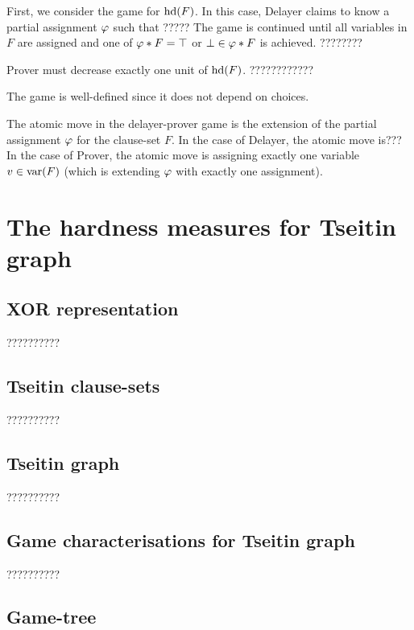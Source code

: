 \documentclass[]{book}
\begin{document}
First, we consider the game for $\operatorname{hd}(F)$. In this case, Delayer claims to know a partial assignment $\varphi$ such that ?????
The game is continued until all variables in $F$ are assigned and one of $\varphi * F = \top$ or $ \bot \in \varphi * F$ is achieved. ????????

Prover must decrease exactly one unit of $\operatorname{hd}(F)$. ????????????

\begin{lem}\label{lem:game1}
The game is well-defined since it does not depend on choices.
\end{lem}

\begin{defi}\label{def:atomic-move}
The atomic move in the delayer-prover game is the extension of the partial assignment $\varphi$ for the clause-set $F$. In the case of Delayer, the atomic move is???
In the case of Prover, the atomic move is assigning exactly one variable $v \in \operatorname{var}(F)$ (which is extending $\varphi$ with exactly one assignment).
\end{defi}

\chapter{The hardness measures for Tseitin graph}
\label{cha:hdgame}

\section{XOR representation}
\label{sec:XOR representation}
??????????

\section{Tseitin clause-sets}
\label{sec:Tseitin cls}
??????????

\section{Tseitin graph}
\label{sec:Tseitin graph}
??????????

\section{Game characterisations for Tseitin graph}
\label{sec:hd-game-graph}
??????????
\section{Game-tree}
\label{sec:Game-tree}
\end{document}

